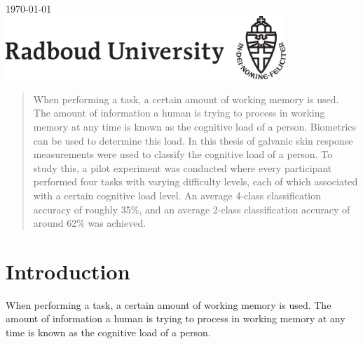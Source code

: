 \documentclass[11pt,leqno,a4paper]{report} %
\begin{document}
\begin{titlepage}

{\large \today}\\[3cm] %


\includegraphics[width=300pt]{radlogo.jpg}%
 

\vfill %

\end{titlepage}


\tableofcontents 
{}

\begin{abstract}
When performing a task, a certain amount of working memory is used. The amount of information a human is trying to process in working memory at any time is known as the cognitive load of a person. Biometrics can be used to determine this load. In this thesis of galvanic skin response measurements were used to classify the cognitive load of a person. To study this, a pilot experiment was conducted where every participant performed four tasks with varying difficulty levels, each of which associated with a certain cognitive load level. An average 4-class classification accuracy of roughly 35\%, and an average 2-class classification accuracy of around 62\% was achieved.

\end{abstract}


\chapter{Introduction}
When performing a task, a certain amount of working memory is used. The amount of information a human is trying to process in working memory at any time is known as the cognitive load of a person. 
\end{document}
